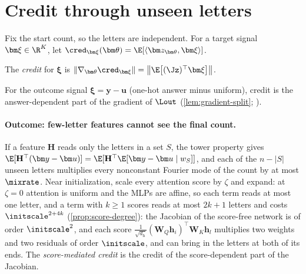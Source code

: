 \section{Credit through unseen letters}
\label{sec:credit}

Fix the start count, so the letters are independent. For a target signal $\bm\xi\in\R^K$, let $\cred_{\bm\xi}(\bm\theta)=\E[\langle\bm z_{\bm\theta},\bm\xi\rangle]$.

\begin{definition}[Credit]
\label{def:credit}
The \emph{credit} for $\bm\xi$ is $\|\nabla_{\bm\theta}\cred_{\bm\xi}\|=\bigl\|\E\bigl[(\Jz)^\top\bm\xi\bigr]\bigr\|$.
\end{definition}
For the outcome signal $\bm\xi=\bm y-\bm u$ (one-hot answer minus uniform), credit is the answer-dependent part of the gradient of
$\Lout$ (\cref{lem:gradient-split}; \citealp{shalevshwartz2017failures,abbe2025parities}).

\paragraph{Outcome: few-letter features cannot see the final count.} If a feature $\mathbf H$ reads only the letters in a set $S$, the tower
property gives $\E[\mathbf H^\top(\bm y-\bm u)]=\E[\mathbf H^\top\E[\bm y-\bm u\mid w_S]]$, and each of the $n-|S|$ unseen letters multiplies every
nonconstant Fourier mode of the count by at most $\mixrate$. Near initialization, scale every attention score by $\zeta$ and expand: at
$\zeta=0$ attention is uniform and the MLPs are affine, so each term reads at most one letter, and a term with $k\ge1$ scores reads at most
$2k+1$ letters and costs $\initscale^{2+4k}$ (\cref{prop:score-degree}): the Jacobian of the score-free network is of order
$\initscale^2$, and each score $\frac{1}{\sqrt{d_{\mathrm h}}}(\mathbf W_Q\bm h_i)^\top\mathbf W_K\bm h_l$ multiplies two weights and two residuals of order
$\initscale$, and can bring in the letters at both of its ends. The \emph{score-mediated credit} is the credit of the score-dependent
part of the Jacobian.

